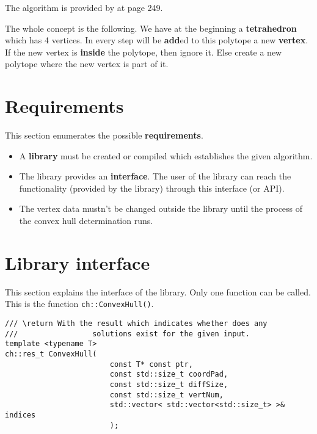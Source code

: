 \begin{algorithm}[H]
\begin{algorithmic}[1]
			\State \Return \conv
		\EndFunction
	\end{algorithmic}
	\end{algorithm}


The algorithm is provided by \citeauthor{compgeo08} at page 249.

The whole concept is the following. We have at the beginning a
\textbf{tetrahed\-ron} which has 4 vertices. In every step will be \textbf{add}ed
to this polytope a new \textbf{vertex}. If the new vertex is \textbf{inside} the
polytope, then ignore it. Else create a new polytope where the new vertex is
part of it.


\section{Requirements}

This section enumerates the possible \textbf{requirements}.

\begin{itemize}

	\item	A \textbf{library} must be created or compiled which establishes the
		given algorithm.

	\item	The library provides an \textbf{interface}. The user of the library
		can reach the functionality (provided by the library) through this
		interface (or API).
		
	\item	The vertex data mustn't be changed outside the library until the
		process of the convex hull determination runs.

\end{itemize}


\section{Library interface}
\label{sec:interface}

This section explains the interface of the library. Only one function can be
called. This is the function \texttt{ch::ConvexHull()}.


\begin{lstlisting}[caption={The only interface function},
					label={lst:intf_func}]
///	\return	With the result which indicates whether does any
///					solutions exist for the given input.
template <typename T>
ch::res_t ConvexHull(
						const T* const ptr,
						const std::size_t coordPad,
						const std::size_t diffSize,
						const std::size_t vertNum,
						std::vector< std::vector<std::size_t> >& indices
						);
\end{lstlisting}

